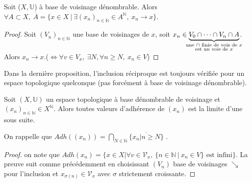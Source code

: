 \begin{proposition}

    Soit ($X,\mathbb{U}$) à base de voisinage dénombrable. Alors \\
    $\forall A\subset X,\ \overline{A}=\{x\in X\ |\ \exists (x_{n})_{n\in \mathbb{N} }\in A^\mathbb{N},\ x_{n}\to x\} $.
\end{proposition}
\begin{proof}
    Soit $(V_n)_{n\in \mathbb{N} }$ une base de voisinages de $x$, soit $x_{n}\in \underbrace{V_0\cap \cdots\cap V_n\cap A}_{\mathclap{\substack{\text{une $\cap $ finie de vois de $x$}\\ \text{est un vois de $x$}}}}$. Alors $x_{n}\to x$.($\Leftrightarrow \forall v\in V_x,\ \exists N, \forall n\ge N, \ x_{n}\in V$)
\end{proof}

\begin{remarque}
Dans la dernière proposition, l'inclusion réciproque est toujours vérifiée pour un espace topologique quelconque (pas forcément à base de voisinage dénombrable).
\end{remarque}

\begin{proposition}
    Soit $(X,\mathbb{U})$ un espace topologique à base dénombrable de voisinage et $(x_{n})_{n\in \mathbb{N} }\in X^\mathbb{N} $. Alors toutes valeurs d'adhérence de $(x_{n})$ est la limite d'une sous suite.
\end{proposition}
On rappelle que $Adh((x_{n}))= \bigcap\limits_{N\in \mathbb{N} }\overline{\{x_{n}|n\ge N\}}$ .
\begin{proof}
     on note que $Adh(x_{n})=\{x\in X|\forall v\in \mathcal{V}_x,\ \{n\in \mathbb{N}\ |\ x_{n}\in V\} \text{ est infini} \}$. La preuve suit comme précédemment en choisissant $(V_n)$ base de voisinages $\searrow$ pour l'inclusion et $x_{\sigma(n)}\in \mathcal{V}_x$ avec $\sigma$ strictement croissante.
\end{proof}

